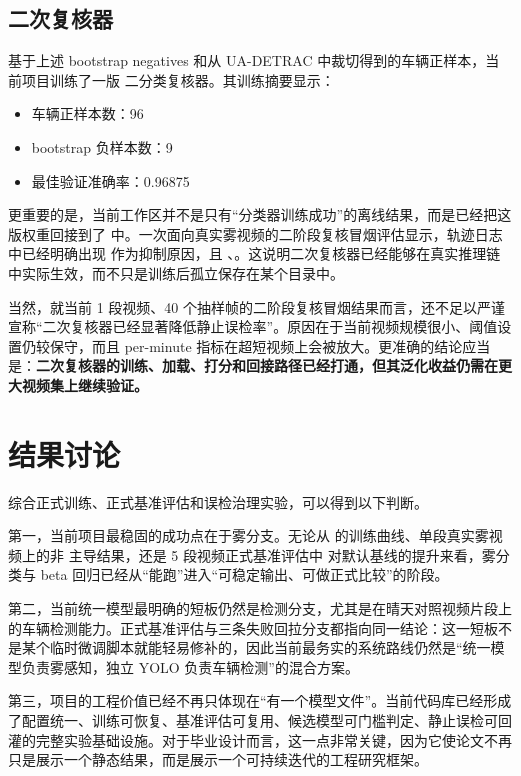 \subsection{二次复核器}

基于上述 bootstrap negatives 和从 UA-DETRAC 中裁切得到的车辆正样本，当前项目训练了一版  二分类复核器。其训练摘要显示：

\begin{itemize}[leftmargin=2em]
\item 车辆正样本数：96
\item bootstrap 负样本数：9
\item 最佳验证准确率：0.96875
\end{itemize}

更重要的是，当前工作区并不是只有“分类器训练成功”的离线结果，而是已经把这版权重回接到了  中。一次面向真实雾视频的二阶段复核冒烟评估显示，轨迹日志中已经明确出现  作为抑制原因，且 、。这说明二次复核器已经能够在真实推理链中实际生效，而不只是训练后孤立保存在某个目录中。

当然，就当前 1 段视频、40 个抽样帧的二阶段复核冒烟结果而言，还不足以严谨宣称“二次复核器已经显著降低静止误检率”。原因在于当前视频规模很小、阈值设置仍较保守，而且 per-minute 指标在超短视频上会被放大。更准确的结论应当是：\textbf{二次复核器的训练、加载、打分和回接路径已经打通，但其泛化收益仍需在更大视频集上继续验证。}

\section{结果讨论}

综合正式训练、正式基准评估和误检治理实验，可以得到以下判断。

第一，当前项目最稳固的成功点在于雾分支。无论从  的训练曲线、单段真实雾视频上的非  主导结果，还是 5 段视频正式基准评估中  对默认基线的提升来看，雾分类与 beta 回归已经从“能跑”进入“可稳定输出、可做正式比较”的阶段。

第二，当前统一模型最明确的短板仍然是检测分支，尤其是在晴天对照视频片段上的车辆检测能力。正式基准评估与三条失败回拉分支都指向同一结论：这一短板不是某个临时微调脚本就能轻易修补的，因此当前最务实的系统路线仍然是“统一模型负责雾感知，独立 YOLO 负责车辆检测”的混合方案。

第三，项目的工程价值已经不再只体现在“有一个模型文件”。当前代码库已经形成了配置统一、训练可恢复、基准评估可复用、候选模型可门槛判定、静止误检可回灌的完整实验基础设施。对于毕业设计而言，这一点非常关键，因为它使论文不再只是展示一个静态结果，而是展示一个可持续迭代的工程研究框架。

